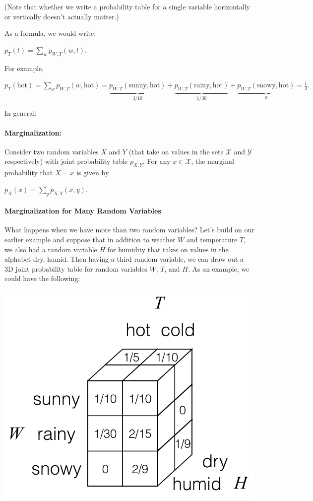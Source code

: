 \documentclass[6008notes.tex]{subfiles}
\begin{document}
(Note that whether we write a probability table for a single variable horizontally or vertically doesn't actually matter.)

As a formula, we would write:

$p_{T}(t)=\sum _{w}p_{W,T}(w,t).$
 
For example,

$p_{T}(\text {hot})=\sum _{w}p_{W,T}(w,\text {hot})=\underbrace{p_{W,T}(\text {sunny},\text {hot})}_{3/10}+\underbrace{p_{W,T}(\text {rainy},\text {hot})}_{1/30}+\underbrace{p_{W,T}(\text {snowy},\text {hot})}_{0}=\frac{1}{3}.$
 
In general:

\paragraph{Marginalization:} Consider two random variables $X$ and $Y$ (that take on values in the sets $\mathcal{X}$ and $\mathcal{Y}$ respectively) with joint probability table $p_{X,Y}$. For any $x\in \mathcal{X}$, the marginal probability that $X=x$ is given by

$p_{X}(x)=\sum _{y}p_{X,Y}(x,y).$
 
\paragraph{Marginalization for Many Random Variables}

What happens when we have more than two random variables? Let's build on our earlier example and suppose that in addition to weather $W$ and temperature $T$, we also had a random variable $H$ for humidity that takes on values in the alphabet {dry, humid}. Then having a third random variable, we can draw out a 3D joint probability table for random variables $W$, $T$, and $H$. As an example, we could have the following:

{\includegraphics[scale=0.4]{images_sec-joint-rv-marg-many-rv-joint-table}}
\end{document}

